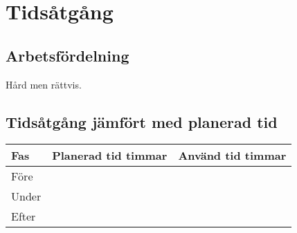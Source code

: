 
\section{Tidsåtgång}

\subsection{Arbetsfördelning}

Hård men rättvis.

\subsection{Tidsåtgång jämfört med planerad tid}
\begin{table}[h!]
\centering
\begin{tabular}{| l | l | l |}
	\hline
	{\textbf{Fas}} & {Planerad tid timmar} & {Använd tid timmar} \\\hline
	{Före} & {} & {} \\\hline
	{Under} & {} & {} \\\hline
	{Efter} & {} & {} \\\hline	

\end{tabular}
\end{table}